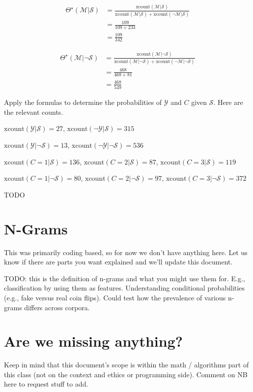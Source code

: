 \documentclass{tufte-handout}
\begin{document}
\begin{align}
\Theta^\star(\mathcal{M}|  \mathcal{S}) &= \frac{\mbox{xcount}(\mathcal{M}| \mathcal{S})}{\mbox{xcount}(\mathcal{M}| \mathcal{S}) + \mbox{xcount}(\neg \mathcal{M}|  \mathcal{S}) } \nonumber \\
&= \frac{109}{109+233} \nonumber \\
&= \frac{109}{342} \nonumber
\end{align}

\begin{align}
\Theta^\star(\mathcal{M}| \neg \mathcal{S}) &= \frac{\mbox{xcount}(\mathcal{M}| \neg \mathcal{S})}{\mbox{xcount}(\mathcal{M}| \neg \mathcal{S}) + \mbox{xcount}(\neg \mathcal{M}| \neg \mathcal{S}) } \nonumber \\
&= \frac{468}{468+81} \nonumber \\
&= \frac{468}{549} \nonumber
\end{align}

\begin{exercise}
Apply the formulas to determine the probabilities of $\mathcal{Y}$ and $C$ given $\mathcal{S}$.  Here are the relevant counts.

\bi
\item $\mbox{xcount}(\mathcal{Y}|  \mathcal{S}) = 27$,  $\mbox{xcount}(\neg \mathcal{Y}|  \mathcal{S}) = 315$
\item $\mbox{xcount}(\mathcal{Y}| \neg \mathcal{S}) = 13$,  $\mbox{xcount}(\neg \mathcal{Y}| \neg \mathcal{S}) = 536$
\item $\mbox{xcount}(C=1 | \mathcal{S}) = 136$, $\mbox{xcount}(C=2 | \mathcal{S}) = 87$, $\mbox{xcount}(C=3 | \mathcal{S}) = 119$
\item $\mbox{xcount}(C=1 | \neg \mathcal{S}) = 80$, $\mbox{xcount}(C=2 | \neg \mathcal{S}) = 97$, $\mbox{xcount}(C=3 | \neg \mathcal{S}) = 372$
\ei
\begin{boxedsolution}
TODO
\end{boxedsolution}

\end{exercise}

\ei



\section{N-Grams}
This was primarily coding based, so for now we don't have anything here.  Let us know if there are parts you want explained and we'll update this document.

TODO: this is the definition of n-grams and what you might use them for.  E.g., classification by using them as features.  Understanding conditional probabilities (e.g., fake versus real coin flips).  Could test how the prevalence of various n-grams differs across corpora.

\section{Are we missing anything?}
Keep in mind that this document's scope is within the math / algorithms part of this class (not on the context and ethics or programming side).  Comment on NB here to request stuff to add. 
\end{document}
